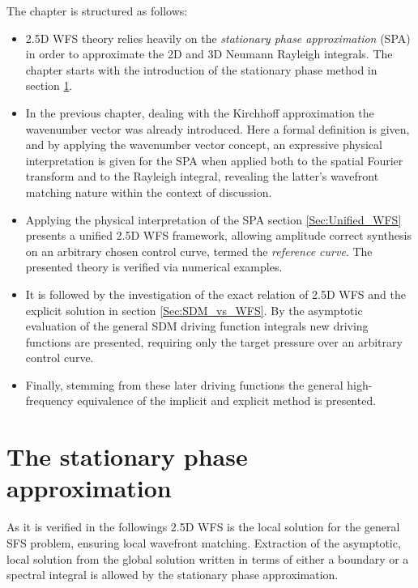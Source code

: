 \vspace{3mm}
The chapter is structured as follows:
\begin{itemize}
\item 2.5D WFS theory relies heavily on the \emph{stationary phase approximation} (SPA) in order to approximate the 2D and 3D Neumann Rayleigh integrals.
The chapter starts with the introduction of the stationary phase method in section \ref{Section:25D_WFS:SPA}.
\item In the previous chapter, dealing with the Kirchhoff approximation the wavenumber vector was already introduced.
Here a formal definition is given, and by applying the wavenumber vector concept, an expressive physical interpretation is given for the SPA when applied both to the spatial Fourier transform and to the Rayleigh integral, revealing the latter's wavefront matching nature within the context of discussion.
\item Applying the physical interpretation of the SPA section \ref{Sec:Unified_WFS} presents a unified 2.5D WFS framework, allowing amplitude correct synthesis on an arbitrary chosen control curve, termed the \emph{reference curve}.
The presented theory is verified via numerical examples.
\item It is followed by the investigation of the exact relation of 2.5D WFS and the explicit solution in section \ref{Sec:SDM_vs_WFS}.
By the asymptotic evaluation of the general SDM driving function integrals new driving functions are presented, requiring only the target pressure over an arbitrary control curve.
\item Finally, stemming from these later driving functions the general high-frequency equivalence of the implicit and explicit method is presented.
\end{itemize}

%
\section{The stationary phase approximation}
\label{Section:25D_WFS:SPA}
%
As it is verified in the followings 2.5D WFS is the local solution for the general SFS problem, ensuring local wavefront matching.
Extraction of the asymptotic, local solution from the global solution written in terms of either a boundary or a spectral integral is allowed by the stationary phase approximation.

